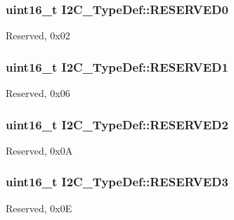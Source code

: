\subsubsection[{\texorpdfstring{R\+E\+S\+E\+R\+V\+E\+D0}{RESERVED0}}]{\setlength{\rightskip}{0pt plus 5cm}uint16\+\_\+t I2\+C\+\_\+\+Type\+Def\+::\+R\+E\+S\+E\+R\+V\+E\+D0}\hypertarget{struct_i2_c___type_def_aee6ec4cf81ee0bb5b038576ba0d738a2}{}\label{struct_i2_c___type_def_aee6ec4cf81ee0bb5b038576ba0d738a2}
Reserved, 0x02 
\subsubsection[{\texorpdfstring{R\+E\+S\+E\+R\+V\+E\+D1}{RESERVED1}}]{\setlength{\rightskip}{0pt plus 5cm}uint16\+\_\+t I2\+C\+\_\+\+Type\+Def\+::\+R\+E\+S\+E\+R\+V\+E\+D1}\hypertarget{struct_i2_c___type_def_a6c3d147223993f2b832b508ee5a5178e}{}\label{struct_i2_c___type_def_a6c3d147223993f2b832b508ee5a5178e}
Reserved, 0x06 
\subsubsection[{\texorpdfstring{R\+E\+S\+E\+R\+V\+E\+D2}{RESERVED2}}]{\setlength{\rightskip}{0pt plus 5cm}uint16\+\_\+t I2\+C\+\_\+\+Type\+Def\+::\+R\+E\+S\+E\+R\+V\+E\+D2}\hypertarget{struct_i2_c___type_def_a5e98c83a176deeb4a8a68f9ca12fdfd2}{}\label{struct_i2_c___type_def_a5e98c83a176deeb4a8a68f9ca12fdfd2}
Reserved, 0x0A 
\subsubsection[{\texorpdfstring{R\+E\+S\+E\+R\+V\+E\+D3}{RESERVED3}}]{\setlength{\rightskip}{0pt plus 5cm}uint16\+\_\+t I2\+C\+\_\+\+Type\+Def\+::\+R\+E\+S\+E\+R\+V\+E\+D3}\hypertarget{struct_i2_c___type_def_a355b2c5aa0dd467de1f9dea4a9afe986}{}\label{struct_i2_c___type_def_a355b2c5aa0dd467de1f9dea4a9afe986}
Reserved, 0x0E 

